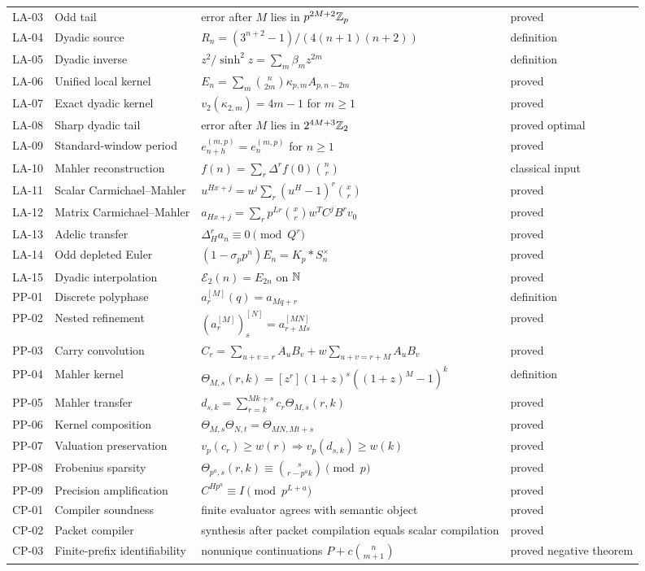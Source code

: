 \documentclass[11pt]{article}
\theoremstyle{definition}\newtheorem{definition}[theorem]{Definition}\newtheorem{example}[theorem]{Example}\newtheorem{construction}[theorem]{Construction}\newtheorem{algorithm}[theorem]{Algorithm}\newtheorem{conjecture}[theorem]{Conjecture}\newtheorem{problem}[theorem]{Problem}
\theoremstyle{remark}\newtheorem{remark}[theorem]{Remark}\newtheorem{boundary}[theorem]{Boundary}\newtheorem{certificate}[theorem]{Computational Certificate}\newtheorem{classical}[theorem]{Classical Input}\newtheorem{principle}[theorem]{Structural Principle}
\begin{document}
\begin{longtable}{L{.08\textwidth}L{.22\textwidth}L{.36\textwidth}L{.12\textwidth}}
LA-03&Odd tail&error after $M$ lies in $p^{2M+2}\mathbb Z_p$&proved\\
LA-04&Dyadic source&$R_n=(3^{n+2}-1)/(4(n+1)(n+2))$&definition\\
LA-05&Dyadic inverse&$z^2/\sinh^2z=\sum_m\beta_mz^{2m}$&definition\\
LA-06&Unified local kernel&$E_n=\sum_m\binom n{2m}\kappa_{p,m}A_{p,n-2m}$&proved\\
LA-07&Exact dyadic kernel&$v_2(\kappa_{2,m})=4m-1$ for $m\geq1$&proved\\
LA-08&Sharp dyadic tail&error after $M$ lies in $2^{4M+3}\mathbb Z_2$&proved optimal\\
LA-09&Standard-window period&$e_{n+h}^{(m,p)}=e_n^{(m,p)}$ for $n\geq1$&proved\\
LA-10&Mahler reconstruction&$f(n)=\sum_r\Delta^rf(0)\binom nr$&classical input\\
LA-11&Scalar Carmichael--Mahler&$u^{Hx+j}=u^j\sum_r(u^H-1)^r\binom xr$&proved\\
LA-12&Matrix Carmichael--Mahler&$a_{Hx+j}=\sum_rp^{Lr}\binom xr w^TC^jB^rv_0$&proved\\
LA-13&Adelic transfer&$\Delta_H^ra_n\equiv0\pmod{Q^r}$&proved\\
LA-14&Odd depleted Euler&$(1-\sigma_pp^n)E_n=K_p*S_n^\times$&proved\\
LA-15&Dyadic interpolation&$\mathscr E_2(n)=E_{2n}$ on $\mathbb N$&proved\\
PP-01&Discrete polyphase&$a_r^{[M]}(q)=a_{Mq+r}$&definition\\
PP-02&Nested refinement&$(a_r^{[M]})_s^{[N]}=a_{r+Ms}^{[MN]}$&proved\\
PP-03&Carry convolution&$C_r=\sum_{u+v=r}A_uB_v+w\sum_{u+v=r+M}A_uB_v$&proved\\
PP-04&Mahler kernel&$\Theta_{M,s}(r,k)=[z^r](1+z)^s((1+z)^M-1)^k$&definition\\
PP-05&Mahler transfer&$d_{s,k}=\sum_{r=k}^{Mk+s}c_r\Theta_{M,s}(r,k)$&proved\\
PP-06&Kernel composition&$\Theta_{M,s}\Theta_{N,t}=\Theta_{MN,Mt+s}$&proved\\
PP-07&Valuation preservation&$v_p(c_r)\geq w(r)\Rightarrow v_p(d_{s,k})\geq w(k)$&proved\\
PP-08&Frobenius sparsity&$\Theta_{p^a,s}(r,k)\equiv\binom{s}{r-p^ak}\pmod p$&proved\\
PP-09&Precision amplification&$C^{Hp^a}\equiv I\pmod{p^{L+a}}$&proved\\
CP-01&Compiler soundness&finite evaluator agrees with semantic object&proved\\
CP-02&Packet compiler&synthesis after packet compilation equals scalar compilation&proved\\
CP-03&Finite-prefix identifiability&nonunique continuations $P+c\binom n{m+1}$&proved negative theorem\\
\bottomrule
\end{longtable}
\normalsize
\end{document}
